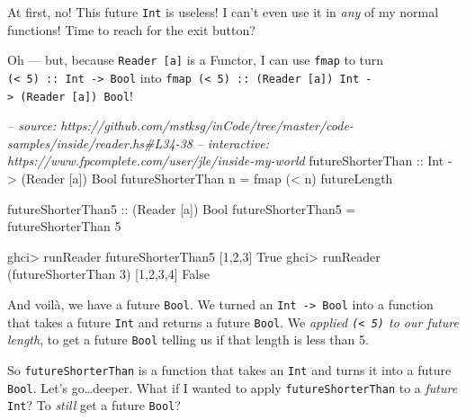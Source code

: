 \documentclass[]{article}
\newenvironment{Shaded}{}{}
\newcommand{\DataTypeTok}[1]{\textcolor[rgb]{0.56,0.13,0.00}{{#1}}}
\newcommand{\DecValTok}[1]{\textcolor[rgb]{0.25,0.63,0.44}{{#1}}}
\newcommand{\CommentTok}[1]{\textcolor[rgb]{0.38,0.63,0.69}{\textit{{#1}}}}
\newcommand{\OtherTok}[1]{\textcolor[rgb]{0.00,0.44,0.13}{{#1}}}
\newcommand{\FunctionTok}[1]{\textcolor[rgb]{0.02,0.16,0.49}{{#1}}}
\newcommand{\NormalTok}[1]{{#1}}
\begin{document}
At first, no! This future \texttt{Int} is useless! I can't even use it
in \emph{any} of my normal functions! Time to reach for the exit button?

Oh --- but, because \texttt{Reader\ {[}a{]}} is a Functor, I can use
\texttt{fmap} to turn
\texttt{(\textless{}\ 5)\ ::\ Int\ -\textgreater{}\ Bool} into
\texttt{fmap\ (\textless{}\ 5)\ ::\ (Reader\ {[}a{]})\ Int\ -\textgreater{}\ (Reader\ {[}a{]})\ Bool}!

\begin{Shaded}
\begin{Highlighting}[]
\CommentTok{-- source: https://github.com/mstksg/inCode/tree/master/code-samples/inside/reader.hs#L34-38}
\CommentTok{-- interactive: https://www.fpcomplete.com/user/jle/inside-my-world}
\OtherTok{futureShorterThan ::} \DataTypeTok{Int} \OtherTok{->} \NormalTok{(}\DataTypeTok{Reader} \NormalTok{[a]) }\DataTypeTok{Bool}
\NormalTok{futureShorterThan n }\FunctionTok{=} \NormalTok{fmap (}\FunctionTok{<} \NormalTok{n) futureLength}

\OtherTok{futureShorterThan5 ::} \NormalTok{(}\DataTypeTok{Reader} \NormalTok{[a]) }\DataTypeTok{Bool}
\NormalTok{futureShorterThan5 }\FunctionTok{=} \NormalTok{futureShorterThan }\DecValTok{5}
\end{Highlighting}
\end{Shaded}

\begin{Shaded}
\begin{Highlighting}[]
\NormalTok{ghci}\FunctionTok{>} \NormalTok{runReader futureShorterThan5 [}\DecValTok{1}\NormalTok{,}\DecValTok{2}\NormalTok{,}\DecValTok{3}\NormalTok{]}
\DataTypeTok{True}
\NormalTok{ghci}\FunctionTok{>} \NormalTok{runReader (futureShorterThan }\DecValTok{3}\NormalTok{) [}\DecValTok{1}\NormalTok{,}\DecValTok{2}\NormalTok{,}\DecValTok{3}\NormalTok{,}\DecValTok{4}\NormalTok{]}
\DataTypeTok{False}
\end{Highlighting}
\end{Shaded}

And voilà, we have a future \texttt{Bool}. We turned an
\texttt{Int\ -\textgreater{}\ Bool} into a function that takes a future
\texttt{Int} and returns a future \texttt{Bool}. We \emph{applied
\texttt{(\textless{}\ 5)} to our future length}, to get a future
\texttt{Bool} telling us if that length is less than 5.

So \texttt{futureShorterThan} is a function that takes an \texttt{Int}
and turns it into a future \texttt{Bool}. Let's go\ldots{}deeper. What
if I wanted to apply \texttt{futureShorterThan} to a \emph{future}
\texttt{Int}? To \emph{still} get a future \texttt{Bool}?
\end{document}
